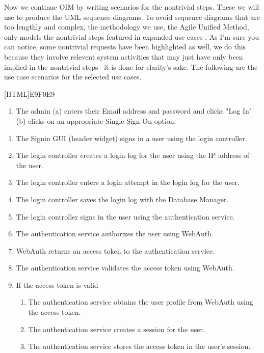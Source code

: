 \documentclass[11pt]{article}
\begin{document}
Now we continue OIM by writing scenarios for the nontrivial steps. These we will use to produce the UML sequence diagrams. To avoid sequence diagrams that are too lengthly and complex, the methodology we use, the Agile Unified Method, only models the nontrivial steps featured in expanded use cases \cite{Book:1}. As I'm sure you can notice, some nontrivial requests have been highlighted as well, we do this because they involve relevent system activities that may just have only been implied in the nontrivial steps-- it is done for clarity's sake. The following are the use case scenarios for the selected use cases.

\begin{table}[H]
	\centering
	[HTML]{E9F0E9}{\parbox{\textwidth}{
		\begin{enumerate}[label=3.]
			\item The admin (a) enters their Email address and password and clicks "Log In" (b) clicks on an appropriate Single Sign On option.
		\end{enumerate}
		\begin{enumerate}[label=4.\arabic*.]
			\item The Signin GUI (header widget) signs in a user using the login controller.
			\item The login controller creates a login log for the user using the IP address of the user.
			\item The login controller enters a login attempt in the login log for the user.
			\item The login controller saves the login log with the Database Manager.
			\item The login controller signs in the user using the authentication service.
			\item The authentication service authorizes the user using WebAuth.
			\item WebAuth returns an access token to the authentication service.
			\item The authentication service validates the access token using WebAuth.
			\item If the access token is valid
			\begin{enumerate}[label*=\arabic*.]
				\item The authentication service obtains the user profile from WebAuth using the access token.
				\item The authentication service creates a session for the user.
				\item The authentication service stores the access token in the user's session.

\end{enumerate}
\end{enumerate}}}
\end{table}
\end{document}
